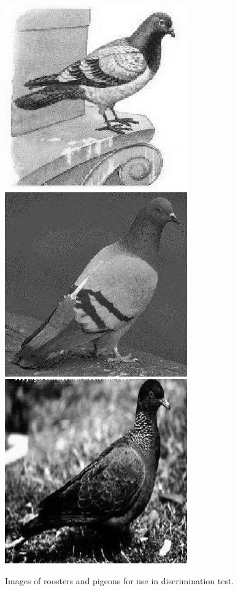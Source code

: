\begin{figure}
      \includegraphics[scale=.2]{pigeonrs-image_0001.jpg}
      \includegraphics[scale=.2]{pigeonrs-image_0002.jpg}
      \includegraphics[scale=.2]{pigeonrs-image_0004.jpg}
      \caption{Images of roosters and pigeons for use in
        discrimination test.}
  \label{fig:birds}
\end{figure}

